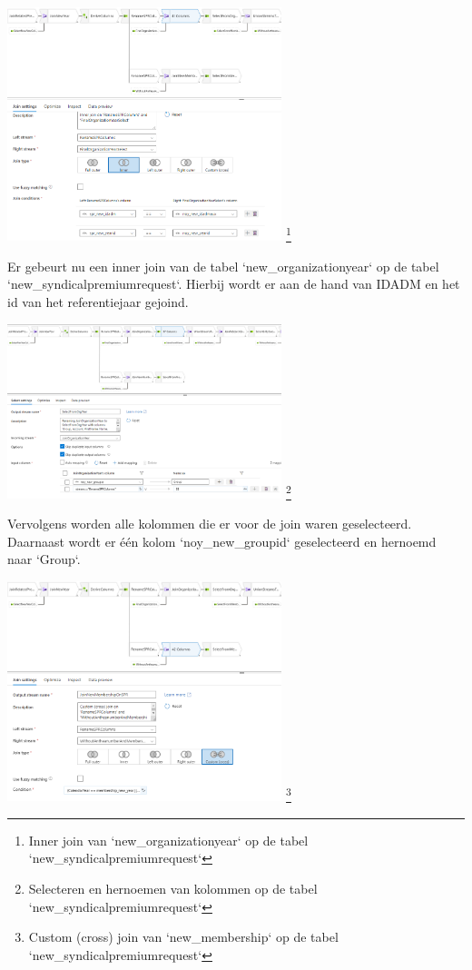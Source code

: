 \begin{center}
    \includegraphics[width=0.6\textwidth]{./graphics/adf/bepalen_groep_4.png}
    \footnote{Inner join van `new\_organizationyear` op de tabel `new\_syndicalpremiumrequest`}
\end{center}

Er gebeurt nu een inner join van de tabel `new\_organizationyear` op de tabel `new\_syndicalpremiumrequest`. Hierbij wordt er aan de hand van IDADM en het id van het referentiejaar gejoind.

\begin{center}
    \includegraphics[width=0.6\textwidth]{./graphics/adf/bepalen_groep_5.png}
    \footnote{Selecteren en hernoemen van kolommen op de tabel `new\_syndicalpremiumrequest`}
\end{center}

Vervolgens worden alle kolommen die er voor de join waren geselecteerd. Daarnaast wordt er één kolom `noy\_new\_groupid` geselecteerd en hernoemd naar `Group`.

\begin{center}
    \includegraphics[width=0.6\textwidth]{./graphics/adf/bepalen_groep_6.png}
    \footnote{Custom (cross) join van `new\_membership` op de tabel `new\_syndicalpremiumrequest`}
\end{center}

